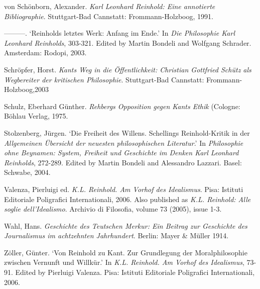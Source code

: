 von Sch\"{o}nborn, Alexander. \textit{Karl Leonhard Reinhold: Eine annotierte Bibliographie}. Stuttgart{-}Bad Cannstatt: Frommann{-}Holzboog, 1991.

{---}{---}{---}. `Reinholds letztes Werk: Anfang im Ende.' In \textit{Die Philosophie Karl Leonhard Reinholds}, 303{-}321. Edited by Martin Bondeli and Wolfgang Schrader. Amsterdam: Rodopi, 2003.

Schr\"{o}pfer, Horst. \textit{Kants Weg in die \"{O}ffentlichkeit: Christian Gottfried Sch\"{u}tz als Wegbereiter der kritischen Philosophie}. Stuttgart{-}Bad Cannstatt: Frommann{-}Holzboog,2003

Schulz, Eberhard G\"{u}nther. \textit{Rehbergs Opposition gegen Kants Ethik }(Cologne: B\"{o}hlau Verlag, 1975.

Stolzenberg, J\"{u}rgen. `Die Freiheit des Willens. Schellings Reinhold{-}Kritik in der \textit{Allgemeinen \"{U}bersicht der neuesten philosophischen Literatur}.' In \textit{Philosophie ohne Beynamen: System, Freiheit und Geschichte im Denken Karl Leonhard Reinholds}, 272{-}289. Edited by Martin Bondeli and Alessandro Lazzari. Basel: Schwabe, 2004.

Valenza, Pierluigi ed.\textit{ K.L. Reinhold. Am Vorhof des Idealismus}. Pisa: Istituti Editoriale Poligrafici Internationali, 2006. Also published as \textit{K.L. Reinhold: Alle soglie dell'Idealismo}. Archivio di Filosofia, volume 73 (2005), issue 1{-}3.

Wahl, Hans. \textit{Geschichte des Teutschen Merkur: Ein Beitrag zur Geschichte des Journalismus im achtzehnten Jahrhundert}. Berlin: Mayer \& M\"{u}ller 1914. 

Z\"{o}ller, G\"{u}nter. `Von Reinhold zu Kant. Zur Grundlegung der Moralphilosophie zwischen Vernunft und Willk\"{u}r.' In \textit{K.L. Reinhold. Am Vorhof des Idealismus}, 73{-}91. Edited by Pierluigi Valenza. Pisa: Istituti Editoriale Poligrafici Internationali, 2006.

